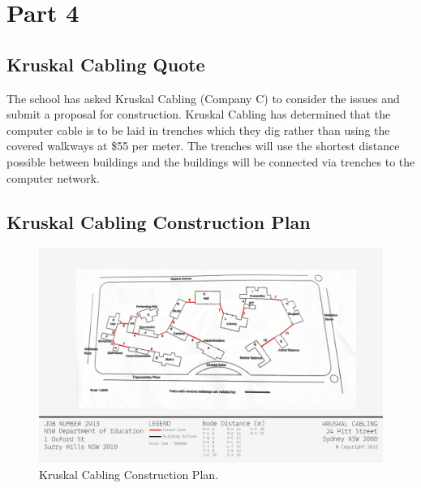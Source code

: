 \documentclass[11pt]{book}
\renewcommand{\=}[1]{\stackrel{#1}{=}} %
\theoremstyle{definition}
\theoremstyle{remark}
\begin{document}
\chapter{Part 4}

\section{Kruskal Cabling Quote}
The school has asked Kruskal Cabling (Company C) to consider the issues and submit a proposal for construction. Kruskal Cabling has determined that the computer cable is to be laid in trenches which they dig rather than using the covered walkways at \$55 per meter. The trenches will use the shortest distance possible between buildings and the buildings will be connected via trenches to the computer network.


\section{Kruskal Cabling Construction Plan}
\begin{figure}
    \centering
    \includegraphics[width=1\linewidth]{img/Kruskal Cabling Plan.png}
    \caption{Kruskal Cabling Construction Plan.}
    \label{fig:enter-label}
\end{figure}
\end{document}
